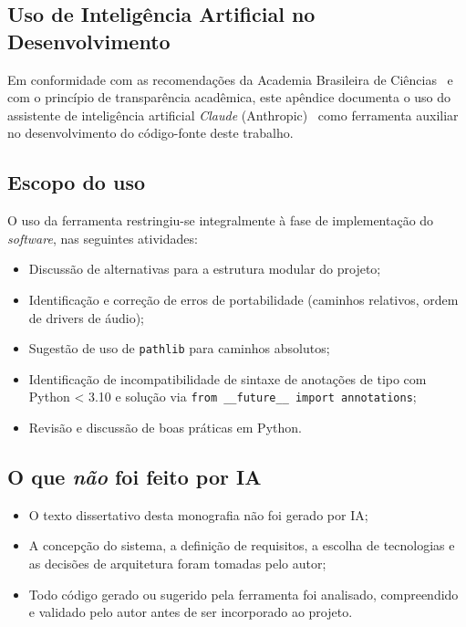 \documentclass[
  12pt,
  openright,
  twoside,
  a4paper,
  english,
  brazil
]{abntex2}
\begin{document}
\begin{apendicesenv}
\chapter{Uso de Inteligência Artificial no Desenvolvimento}
\label{ap:ia}

Em conformidade com as recomendações da Academia Brasileira de
Ciências~\cite{abc2023} e com o princípio de transparência acadêmica,
este apêndice documenta o uso do assistente de inteligência artificial
\textit{Claude} (Anthropic)~\cite{claude2024} como ferramenta auxiliar
no desenvolvimento do código-fonte deste trabalho.

\section*{Escopo do uso}

O uso da ferramenta restringiu-se integralmente à fase de
implementação do \textit{software}, nas seguintes atividades:

\begin{itemize}
  \item Discussão de alternativas para a estrutura modular do projeto;
  \item Identificação e correção de erros de portabilidade
        (caminhos relativos, ordem de drivers de áudio);
  \item Sugestão de uso de \texttt{pathlib} para caminhos absolutos;
  \item Identificação de incompatibilidade de sintaxe de anotações de
        tipo com Python < 3.10 e solução via
        \texttt{from \_\_future\_\_ import annotations};
  \item Revisão e discussão de boas práticas em Python.
\end{itemize}

\section*{O que \emph{não} foi feito por IA}

\begin{itemize}
  \item O texto dissertativo desta monografia não foi gerado por IA;
  \item A concepção do sistema, a definição de requisitos, a escolha
        de tecnologias e as decisões de arquitetura foram tomadas
        pelo autor;
  \item Todo código gerado ou sugerido pela ferramenta foi
        analisado, compreendido e validado pelo autor antes de
        ser incorporado ao projeto.
\end{itemize}


\end{apendicesenv}
\end{document}
